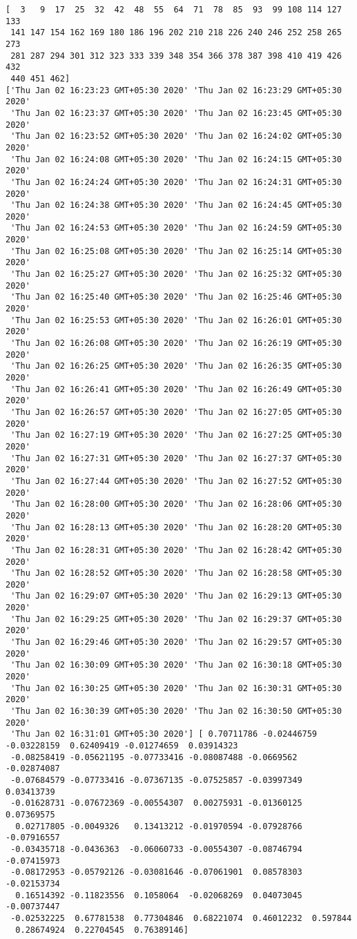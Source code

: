 \documentclass[11pt]{article}
\begin{document}
    \begin{Verbatim}[commandchars=\\\{\}]
[  3   9  17  25  32  42  48  55  64  71  78  85  93  99 108 114 127 133
 141 147 154 162 169 180 186 196 202 210 218 226 240 246 252 258 265 273
 281 287 294 301 312 323 333 339 348 354 366 378 387 398 410 419 426 432
 440 451 462]
['Thu Jan 02 16:23:23 GMT+05:30 2020' 'Thu Jan 02 16:23:29 GMT+05:30 2020'
 'Thu Jan 02 16:23:37 GMT+05:30 2020' 'Thu Jan 02 16:23:45 GMT+05:30 2020'
 'Thu Jan 02 16:23:52 GMT+05:30 2020' 'Thu Jan 02 16:24:02 GMT+05:30 2020'
 'Thu Jan 02 16:24:08 GMT+05:30 2020' 'Thu Jan 02 16:24:15 GMT+05:30 2020'
 'Thu Jan 02 16:24:24 GMT+05:30 2020' 'Thu Jan 02 16:24:31 GMT+05:30 2020'
 'Thu Jan 02 16:24:38 GMT+05:30 2020' 'Thu Jan 02 16:24:45 GMT+05:30 2020'
 'Thu Jan 02 16:24:53 GMT+05:30 2020' 'Thu Jan 02 16:24:59 GMT+05:30 2020'
 'Thu Jan 02 16:25:08 GMT+05:30 2020' 'Thu Jan 02 16:25:14 GMT+05:30 2020'
 'Thu Jan 02 16:25:27 GMT+05:30 2020' 'Thu Jan 02 16:25:32 GMT+05:30 2020'
 'Thu Jan 02 16:25:40 GMT+05:30 2020' 'Thu Jan 02 16:25:46 GMT+05:30 2020'
 'Thu Jan 02 16:25:53 GMT+05:30 2020' 'Thu Jan 02 16:26:01 GMT+05:30 2020'
 'Thu Jan 02 16:26:08 GMT+05:30 2020' 'Thu Jan 02 16:26:19 GMT+05:30 2020'
 'Thu Jan 02 16:26:25 GMT+05:30 2020' 'Thu Jan 02 16:26:35 GMT+05:30 2020'
 'Thu Jan 02 16:26:41 GMT+05:30 2020' 'Thu Jan 02 16:26:49 GMT+05:30 2020'
 'Thu Jan 02 16:26:57 GMT+05:30 2020' 'Thu Jan 02 16:27:05 GMT+05:30 2020'
 'Thu Jan 02 16:27:19 GMT+05:30 2020' 'Thu Jan 02 16:27:25 GMT+05:30 2020'
 'Thu Jan 02 16:27:31 GMT+05:30 2020' 'Thu Jan 02 16:27:37 GMT+05:30 2020'
 'Thu Jan 02 16:27:44 GMT+05:30 2020' 'Thu Jan 02 16:27:52 GMT+05:30 2020'
 'Thu Jan 02 16:28:00 GMT+05:30 2020' 'Thu Jan 02 16:28:06 GMT+05:30 2020'
 'Thu Jan 02 16:28:13 GMT+05:30 2020' 'Thu Jan 02 16:28:20 GMT+05:30 2020'
 'Thu Jan 02 16:28:31 GMT+05:30 2020' 'Thu Jan 02 16:28:42 GMT+05:30 2020'
 'Thu Jan 02 16:28:52 GMT+05:30 2020' 'Thu Jan 02 16:28:58 GMT+05:30 2020'
 'Thu Jan 02 16:29:07 GMT+05:30 2020' 'Thu Jan 02 16:29:13 GMT+05:30 2020'
 'Thu Jan 02 16:29:25 GMT+05:30 2020' 'Thu Jan 02 16:29:37 GMT+05:30 2020'
 'Thu Jan 02 16:29:46 GMT+05:30 2020' 'Thu Jan 02 16:29:57 GMT+05:30 2020'
 'Thu Jan 02 16:30:09 GMT+05:30 2020' 'Thu Jan 02 16:30:18 GMT+05:30 2020'
 'Thu Jan 02 16:30:25 GMT+05:30 2020' 'Thu Jan 02 16:30:31 GMT+05:30 2020'
 'Thu Jan 02 16:30:39 GMT+05:30 2020' 'Thu Jan 02 16:30:50 GMT+05:30 2020'
 'Thu Jan 02 16:31:01 GMT+05:30 2020'] [ 0.70711786 -0.02446759 -0.03228159  0.62409419 -0.01274659  0.03914323
 -0.08258419 -0.05621195 -0.07733416 -0.08087488 -0.0669562  -0.02874087
 -0.07684579 -0.07733416 -0.07367135 -0.07525857 -0.03997349  0.03413739
 -0.01628731 -0.07672369 -0.00554307  0.00275931 -0.01360125  0.07369575
  0.02717805 -0.0049326   0.13413212 -0.01970594 -0.07928766 -0.07916557
 -0.03435718 -0.0436363  -0.06060733 -0.00554307 -0.08746794 -0.07415973
 -0.08172953 -0.05792126 -0.03081646 -0.07061901  0.08578303 -0.02153734
  0.16514392 -0.11823556  0.1058064  -0.02068269  0.04073045 -0.00737447
 -0.02532225  0.67781538  0.77304846  0.68221074  0.46012232  0.597844
  0.28674924  0.22704545  0.76389146]

    \end{Verbatim}
\end{document}
